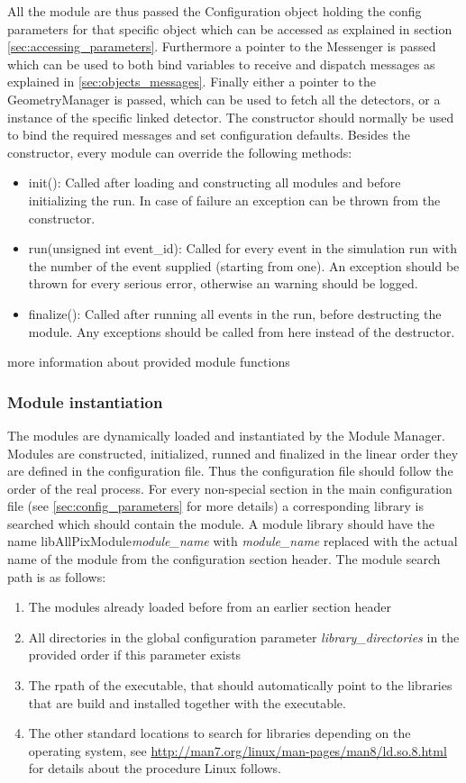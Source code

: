 All the module are thus passed the Configuration object holding the config parameters for that specific object which can be accessed as explained in section \ref{sec:accessing_parameters}. Furthermore a pointer to the Messenger is passed which can be used to both bind variables to receive and dispatch messages as explained in \ref{sec:objects_messages}. Finally either a pointer to the GeometryManager is passed, which can be used to fetch all the detectors, or a instance of the specific linked detector. The constructor should normally be used to bind the required messages and set configuration defaults. Besides the constructor, every module can override the following methods:
\begin{itemize}
\item init(): Called after loading and constructing all modules and before initializing the run. In case of failure an exception can be thrown from the constructor.
\item run(unsigned int event\_id): Called for every event in the simulation run with the number of the event supplied (starting from one). An exception should be thrown for every serious error, otherwise an warning should be logged.
\item finalize(): Called after running all events in the run, before destructing the module. Any exceptions should be called from here instead of the destructor.
\end{itemize}

\todo more information about provided module functions \todo

\subsubsection{Module instantiation}
\label{sec:module_instantiation}
The modules are dynamically loaded and instantiated by the Module Manager. Modules are constructed, initialized, runned and finalized in the linear order they are defined in the configuration file. Thus the configuration file should follow the order of the real process. For every non-special section in the main configuration file (see \ref{sec:config_parameters} for more details) a corresponding library is searched which should contain the module. A module library should have the name libAllPixModule\textit{module\_name} with \textit{module\_name} replaced with the actual name of the module from the configuration section header. The module search path is as follows:
\begin{enumerate}
\item The modules already loaded before from an earlier section header
\item All directories in the global configuration parameter \textit{library\_directories} in the provided order if this parameter exists
\item The rpath of the executable, that should automatically point to the libraries that are build and installed together with the executable.
\item The other standard locations to search for libraries depending on the operating system, see \url{http://man7.org/linux/man-pages/man8/ld.so.8.html} for details about the procedure Linux follows.
\end{enumerate}

